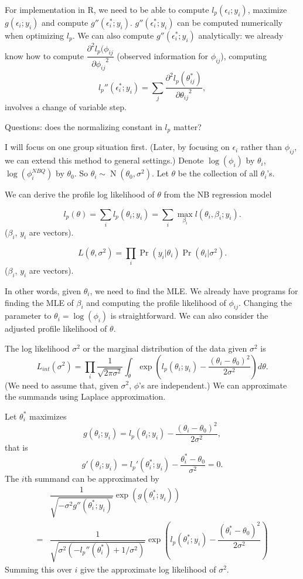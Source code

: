\documentclass[letterpaper, 12pt]{article}
\DeclareMathOperator{\N}{N}
\renewcommand{\Pr}{\mathop{\mathrm{Pr}}\nolimits}
\newcommand{\ddpp}[2]{ \dfrac{\partial^2 #1}{ {\partial #2}^2}}
\begin{document}
For implementation in R, we need to be able to compute $l_p(\epsilon_i; y_i)$,
maximize $g(\epsilon_i; y_i)$ and compute $g''(\epsilon_i^*; y_i)$.
$g''(\epsilon_i^*; y_i)$ can be computed numerically when optimizing $l_p$.
We can also  compute $g''(\epsilon_i^*; y_i)$ analytically:  we already know
how to compute $\ddpp{l_p(\phi_{ij}}{\phi_{ij}}$ (observed information for
$\phi_{ij}$), computing \[l_p''(\epsilon_i^*; y_i) = \sum_j
\ddpp{l_p(\theta_{ij}^*)}{\theta_{ij}},\]  involves a change of variable
step.



Questions: does the normalizing constant in $l_p$ matter?


\newpage
I will focus on one group situation first. (Later, by focusing on $\epsilon_i$
rather than $\phi_{ij}$, we can extend this method to general settings.)
Denote $\log(\phi_{i})$ by $\theta_{i}$, $\log(\phi_{i}^{NBQ})$ by $\theta_0$.
So $\theta_i \sim \N(\theta_0, \sigma^2)$.
Let $\theta$ be the collection of all $\theta_{i}$'s.

We can derive the profile log likelihood of $\theta$ from the NB regression
model

\[ l_p(\theta) = \sum_i l_p(\theta_i; y_i) = \sum_i \max_{\beta_i} l(\theta_{i}, \beta_i; y_i). \] ($\beta_i$, $y_i$ are vectors).

\[ L(\theta, \sigma^2) = \prod_i \Pr(y_i | \theta_i) \Pr(\theta_i|\sigma^2).  \]
($\beta_i$, $y_i$ are vectors).

In other words, given $\theta_i$, we need to
find the MLE. We already have programs for finding the MLE of $\beta_i$ and
computing the profile likelihood of $\phi_{ij}$. Changing the parameter to
$\theta_i = \log(\phi_i)$ is straightforward.  We can also consider the
adjusted profile likelihood of $\theta$.

The log likelihood $\sigma^2$ or the marginal distribution of the data
given $\sigma^2$ is
\[ L_{int}(\sigma^2) = \prod_i \dfrac{1}{ \sqrt{2 \pi \sigma^2}}\int_\theta
\exp\left(l_p(\theta_i; y_i) - \dfrac{(\theta_i - \theta_0)^2}{2 \sigma^2} \right) d\theta.  \]
(We need to assume that, given $\sigma^2$, $\phi$'s are independent.)
We can approximate the summands using Laplace approximation.

Let $\theta_i^*$ maximizes
\[ g(\theta_i; y_i) = l_p(\theta_i; y_i) - \dfrac{(\theta_i - \theta_0)^2}{2 \sigma^2}, \]
that is
\[ g'(\theta_i; y_i) = l_p'(\theta_i^*; y_i) - \dfrac{\theta_i^* - \theta_0}{\sigma^2} = 0. \]
The $i$th summand can be approximated by
\begin{align*}
    &\dfrac{1}{ \sqrt{-\sigma^2 g''(\theta_i^*; y_i)}}
    \exp\left(g(\theta_i^*; y_i)\right)  \\
    =& \dfrac{1}{ \sqrt{\sigma^2 \left(- l_p''(\theta_i^*) +
    1/\sigma^2\right)}}
\exp\left(l_p(\theta_i^*; y_i) - \dfrac{(\theta_i^* - \theta_0)^2}{2 \sigma^2} \right)
\end{align*}
Summing this over $i$ give the approximate log likelihood of $\sigma^2$.
\end{document}
